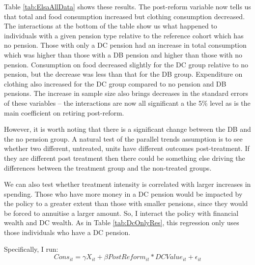 \documentclass[12pt]{article}
\begin{document}
Table \ref{tab:ElsaAllData} shows these results. The post-reform variable now
tells us that total and food consumption increased but clothing consumption
decreased. The interactions at the bottom of the table show us what happened to
individuals with a given pension type relative to the reference cohort which has
no pension. Those with only a DC pension had an increase in total consumption
which was higher than those with a DB pension and higher than those with no
pension. Consumption on food decreased slightly for the DC group relative to no
pension, but the decrease was less than that for the DB group. Expenditure on
clothing also increased for the DC group compared to no pension and DB pensions.
The increase in sample size also brings decreases in the standard errors of
these variables -- the interactions are now all significant a the 5\% level as
is the main coefficient on retiring post-reform.

However, it is worth noting that there is a significant change between the DB
and the no pension group. A natural test of the parallel trends assumption is to
see whether two different, untreated, units have different outcomes
post-treatment. If they are different post treatment then there could be
something else driving the differences between the treatment group and the
non-treated groups.

We can also test whether treatment intensity is correlated with larger increases
in spending. Those who have more money in a DC pension would be impacted by the
policy to a greater extent than those with smaller pensions, since they would be
forced to annuitise a larger amount. So, I interact the policy with financial
wealth and DC wealth. As in Table \ref{tab:DcOnlyRes}, this regression only uses
those individuals who have a DC pension.

Specifically, I run:
\begin{equation*}
    Cons_{it} =  \gamma X_{it} + \beta PostReform_{it}*DCValue_{it} + \epsilon_{it}
\end{equation*}


\begin{landscape}
    \linespread{1}

    
\end{landscape}

\begin{landscape}
    \linespread{1}

    
\end{landscape}
\end{document}
